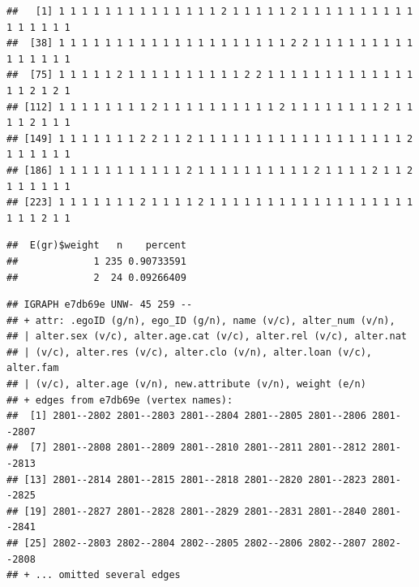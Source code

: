 \documentclass[
]{book}
\newenvironment{Shaded}{\begin{snugshade}}{\end{snugshade}}
\newcommand{\CommentTok}[1]{\textcolor[rgb]{0.56,0.35,0.01}{\textit{#1}}}
\newcommand{\DecValTok}[1]{\textcolor[rgb]{0.00,0.00,0.81}{#1}}
\newcommand{\FunctionTok}[1]{\textcolor[rgb]{0.00,0.00,0.00}{#1}}
\newcommand{\NormalTok}[1]{#1}
\newcommand{\OtherTok}[1]{\textcolor[rgb]{0.56,0.35,0.01}{#1}}
\newcommand{\SpecialCharTok}[1]{\textcolor[rgb]{0.00,0.00,0.00}{#1}}
\begin{document}
\begin{Shaded}
\end{Shaded}

\begin{verbatim}
##   [1] 1 1 1 1 1 1 1 1 1 1 1 1 1 1 2 1 1 1 1 1 2 1 1 1 1 1 1 1 1 1 1 1 1 1 1 1 1
##  [38] 1 1 1 1 1 1 1 1 1 1 1 1 1 1 1 1 1 1 1 1 2 2 1 1 1 1 1 1 1 1 1 1 1 1 1 1 1
##  [75] 1 1 1 1 1 2 1 1 1 1 1 1 1 1 1 1 2 2 1 1 1 1 1 1 1 1 1 1 1 1 1 1 1 2 1 2 1
## [112] 1 1 1 1 1 1 1 1 2 1 1 1 1 1 1 1 1 1 1 2 1 1 1 1 1 1 1 1 2 1 1 1 1 2 1 1 1
## [149] 1 1 1 1 1 1 1 2 2 1 1 2 1 1 1 1 1 1 1 1 1 1 1 1 1 1 1 1 1 1 2 1 1 1 1 1 1
## [186] 1 1 1 1 1 1 1 1 1 1 1 2 1 1 1 1 1 1 1 1 1 1 2 1 1 1 1 2 1 1 2 1 1 1 1 1 1
## [223] 1 1 1 1 1 1 1 2 1 1 1 1 2 1 1 1 1 1 1 1 1 1 1 1 1 1 1 1 1 1 1 1 1 1 2 1 1
\end{verbatim}

\begin{Shaded}
\end{Shaded}

\begin{verbatim}
##  E(gr)$weight   n    percent
##             1 235 0.90733591
##             2  24 0.09266409
\end{verbatim}

\begin{Shaded}
\end{Shaded}

\begin{verbatim}
## IGRAPH e7db69e UNW- 45 259 -- 
## + attr: .egoID (g/n), ego_ID (g/n), name (v/c), alter_num (v/n),
## | alter.sex (v/c), alter.age.cat (v/c), alter.rel (v/c), alter.nat
## | (v/c), alter.res (v/c), alter.clo (v/n), alter.loan (v/c), alter.fam
## | (v/c), alter.age (v/n), new.attribute (v/n), weight (e/n)
## + edges from e7db69e (vertex names):
##  [1] 2801--2802 2801--2803 2801--2804 2801--2805 2801--2806 2801--2807
##  [7] 2801--2808 2801--2809 2801--2810 2801--2811 2801--2812 2801--2813
## [13] 2801--2814 2801--2815 2801--2818 2801--2820 2801--2823 2801--2825
## [19] 2801--2827 2801--2828 2801--2829 2801--2831 2801--2840 2801--2841
## [25] 2802--2803 2802--2804 2802--2805 2802--2806 2802--2807 2802--2808
## + ... omitted several edges
\end{verbatim}
\end{document}
